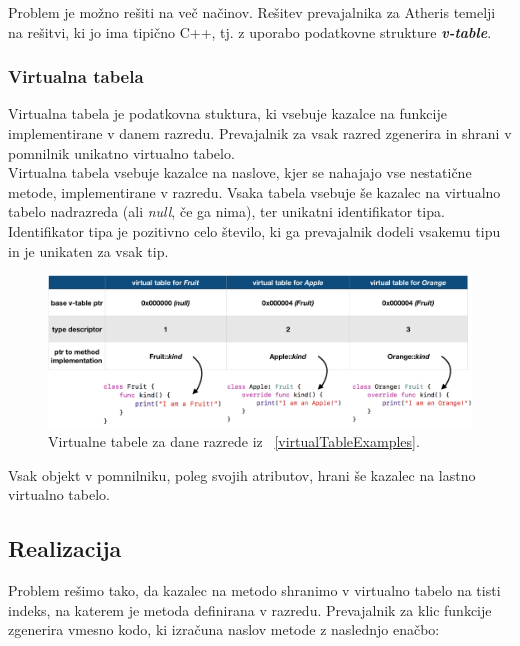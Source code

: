 \documentclass[a4paper, 12p]{book}
\begin{document}
\indent Problem je možno rešiti na več načinov. Rešitev prevajalnika za Atheris temelji na rešitvi, ki jo ima tipično C++, tj. z uporabo podatkovne strukture \textit{\textbf{v-table}}. 

\subsubsection{Virtualna tabela}

Virtualna tabela je podatkovna stuktura, ki vsebuje kazalce na funkcije implementirane v danem razredu. Prevajalnik za vsak razred zgenerira in shrani v pomnilnik unikatno virtualno tabelo. \\
\indent Virtualna tabela vsebuje kazalce na naslove, kjer se nahajajo vse nestatične metode, implementirane v razredu. Vsaka tabela vsebuje še kazalec na virtualno tabelo nadrazreda (ali \textit{null}, če ga nima), ter unikatni identifikator tipa. Identifikator tipa je pozitivno celo število, ki ga prevajalnik dodeli vsakemu tipu in je unikaten za vsak tip.

\begin{figure}[h]
	\begin{center}
		\includegraphics[width=1.1\textwidth]{resources/vtables.png}
	\end{center}
	\caption{Virtualne tabele za dane razrede iz ~\ref{virtualTableExamples}.}
	\label{vtables}
\end{figure}

\indent Vsak objekt v pomnilniku, poleg svojih atributov, hrani še kazalec na lastno virtualno tabelo.

\subsection{Realizacija}

Problem rešimo tako, da kazalec na metodo shranimo v virtualno tabelo na tisti indeks, na katerem je metoda definirana v razredu. Prevajalnik za klic funkcije zgenerira vmesno kodo, ki izračuna naslov metode z naslednjo enačbo:
\end{document}
